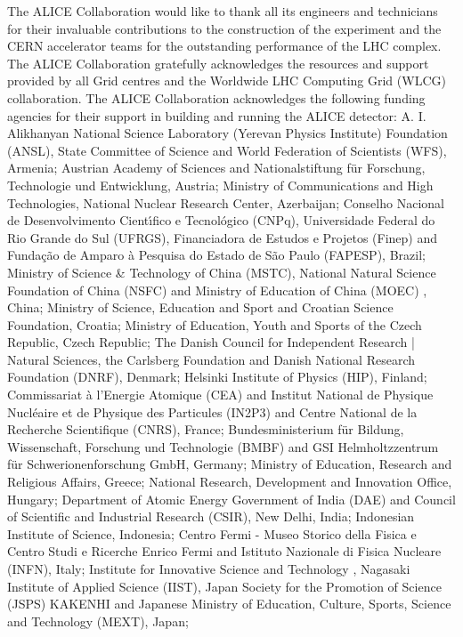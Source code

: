 
The ALICE Collaboration would like to thank all its engineers and technicians for their invaluable contributions to the construction of the experiment and the CERN accelerator teams for the outstanding performance of the LHC complex.
%
The ALICE Collaboration gratefully acknowledges the resources and support provided by all Grid centres and the Worldwide LHC Computing Grid (WLCG) collaboration.
%
The ALICE Collaboration acknowledges the following funding agencies for their support in building and running the ALICE detector:
%
A. I. Alikhanyan National Science Laboratory (Yerevan Physics Institute) Foundation (ANSL), State Committee of Science and World Federation of Scientists (WFS), Armenia;
%
Austrian Academy of Sciences and Nationalstiftung f\"{u}r Forschung, Technologie und Entwicklung, Austria;
%
Ministry of Communications and High Technologies, National Nuclear Research Center, Azerbaijan;
%
Conselho Nacional de Desenvolvimento Cient\'{\i}fico e Tecnol\'{o}gico (CNPq), Universidade Federal do Rio Grande do Sul (UFRGS), Financiadora de Estudos e Projetos (Finep) and Funda\c{c}\~{a}o de Amparo \`{a} Pesquisa do Estado de S\~{a}o Paulo (FAPESP), Brazil;
%
Ministry of Science \& Technology of China (MSTC), National Natural Science Foundation of China (NSFC) and Ministry of Education of China (MOEC) , China;
%
Ministry of Science, Education and Sport and Croatian Science Foundation, Croatia;
%
Ministry of Education, Youth and Sports of the Czech Republic, Czech Republic;
%
The Danish Council for Independent Research | Natural Sciences, the Carlsberg Foundation and Danish National Research Foundation (DNRF), Denmark;
%
Helsinki Institute of Physics (HIP), Finland;
%
Commissariat \`{a} l'Energie Atomique (CEA) and Institut National de Physique Nucl\'{e}aire et de Physique des Particules (IN2P3) and Centre National de la Recherche Scientifique (CNRS), France;
%
Bundesministerium f\"{u}r Bildung, Wissenschaft, Forschung und Technologie (BMBF) and GSI Helmholtzzentrum f\"{u}r Schwerionenforschung GmbH, Germany;
%
Ministry of Education, Research and Religious Affairs, Greece;
%
National Research, Development and Innovation Office, Hungary;
%
Department of Atomic Energy Government of India (DAE) and Council of Scientific and Industrial Research (CSIR), New Delhi, India;
%
Indonesian Institute of Science, Indonesia;
%
Centro Fermi - Museo Storico della Fisica e Centro Studi e Ricerche Enrico Fermi and Istituto Nazionale di Fisica Nucleare (INFN), Italy;
%
Institute for Innovative Science and Technology , Nagasaki Institute of Applied Science (IIST), Japan Society for the Promotion of Science (JSPS) KAKENHI and Japanese Ministry of Education, Culture, Sports, Science and Technology (MEXT), Japan;
